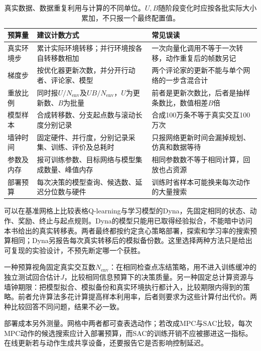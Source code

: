 \begin{table}[t]
  \centering
  \small
  \begin{tabularx}{\linewidth}{>{\raggedright\arraybackslash}p{27mm} >{\raggedright\arraybackslash}X >{\raggedright\arraybackslash}X}
    \toprule
    预算量 & 建议计数方式 & 常见误读 \\
    \midrule
    真实环境步 & 累计实际环境转移；并行环境按各自转移数相加 & 一次向量化调用不等于一次转移，动作重复后的帧数另记 \\
    梯度步 & 按优化器更新次数，并分开行动者、评论家、模型 & 两个评论家的更新不能与单个网络的一步含混合计 \\
    重放比例 & 同时报$U/N_{\mathrm{env}}$及$UB/N_{\mathrm{env}}$，$U$为更新数、$B$为批量 & 前者是更新次数比，后者是抽样条数比，数值相差$B$倍 \\
    模型样本 & 合成转移数、分支起点数与滚动长度分别记录 & 合成100万条不等于真实交互100万次 \\
    墙钟时间 & 固定硬件、并行度，分别记录采集、训练、评价及总耗时 & 只报网络更新时间会漏掉规划、仿真和数据等待 \\
    参数及内存 & 报可训练参数、目标网络与模型集成数量、峰值内存 & 相同参数数不等于相同计算，回放也占资源 \\
    部署预算 & 每次决策的模型查询、候选数、延迟分位数与硬件 & 训练时省样本可能换来每次动作的大量搜索 \\
    \bottomrule
  \end{tabularx}
  \caption{真实数据、数据重复利用与计算的不同单位。$U,B$随阶段变化时应按各批实际大小累加，不只报一个最终配置值。}
  \label{tab:rl-learning-budget-units}
\end{table}

可以在基准网格上比较表格Q-learning与学习模型的Dyna，先固定相同的状态、动作、奖励、终止与起点规则。Dyna的模型只能用已取得经验拟合，不能暗中访问本书给出的真实转移表。两者最终都按约定贪心策略部署，探索和学习率的搜索预算相同；Dyna另报告每次真实转移后的模拟备份数。这里选择两种方法只是给出可复现的实验设计，不预先断定哪一个获胜。

一种预算视角固定真实交互数$N_{\mathrm{env}}$：在相同检查点冻结策略，用不进入训练缓冲的独立测试回合估计$J$，比较相同信息预算下的决策质量。另一种固定总计算资源与墙钟期限：把模型拟合、模拟备份和真实环境执行都计入，比较期限内得到的策略。前者允许算法多花计算提高样本利用率，后者则要求为这些计算付出代价。两种比较回答不同问题，结果不必一致。

部署成本另外测量。网格中两者都可查表选动作；若改成MPC与SAC比较，每次MPC动作的候选搜索应计入部署预算，而SAC的训练开销不应被挪进这一指标。在线更新若与动作生成共享设备，还要报告它是否影响控制延迟。


